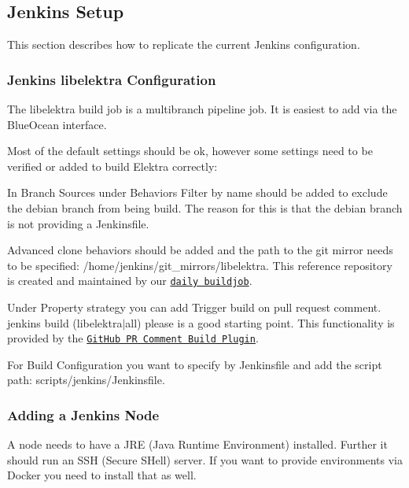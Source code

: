\subsection*{Jenkins Setup}

This section describes how to replicate the current Jenkins configuration.

\subsubsection*{Jenkins libelektra Configuration}

The {\ttfamily libelektra} build job is a multibranch pipeline job. It is easiest to add via the Blue\+Ocean interface.

Most of the default settings should be ok, however some settings need to be verified or added to build Elektra correctly\+:


\begin{DoxyItemize}
\item In Branch Sources under Behaviors {\ttfamily Filter by name} should be added to exclude the {\ttfamily debian} branch from being build. The reason for this is that the {\ttfamily debian} branch is not providing a Jenkinsfile.
\item {\ttfamily Advanced clone behaviors} should be added and the path to the git mirror needs to be specified\+: {\ttfamily /home/jenkins/git\+\_\+mirrors/libelektra}. This reference repository is created and maintained by our \href{https://build.libelektra.org/jenkins/job/libelektra-daily/}{\tt daily buildjob}.
\item Under Property strategy you can add {\ttfamily Trigger build on pull request comment}. {\ttfamily jenkins build (libelektra$\vert$all) please} is a good starting point. This functionality is provided by the \href{https://wiki.jenkins-ci.org/display/JENKINS/GitHub+PR+Comment+Build+Plugin}{\tt Git\+Hub PR Comment Build Plugin}.
\item For Build Configuration you want to specify {\ttfamily by Jenkinsfile} and add the script path\+: {\ttfamily scripts/jenkins/\+Jenkinsfile}.
\end{DoxyItemize}

\subsubsection*{Adding a Jenkins Node}

A node needs to have a J\+RE (Java Runtime Environment) installed. Further it should run an S\+SH (Secure S\+Hell) server. If you want to provide environments via Docker you need to install that as well.

